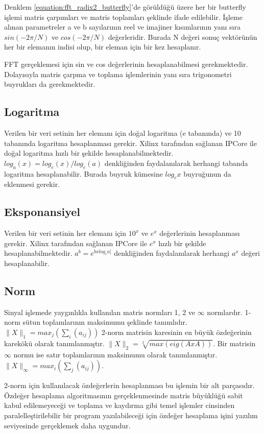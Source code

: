 Denklem \ref{equation:fft_radix2_butterfly}'de görüldüğü üzere her bir butterfly işlemi matris çarpımları ve matris toplamları şeklinde ifade edilebilir. İşleme alınan parametreler a ve b sayılarının reel ve imajiner kısımlarının yanı sıra $sin(-2\pi/N)$ ve $cos(-2\pi/N)$ değerleridir. Burada N değeri sonuç vektörünün her bir elemanın indisi olup, bir eleman için bir kez hesaplanır. \par
FFT gerçeklemesi için sin ve cos değerlerinin hesaplanabilmesi gerekmektedir. Dolayısıyla matris çarpma ve toplama işlemlerinin yanı sıra trigonometri buyrukları da gerekmektedir.

\subsection{Logaritma}
Verilen bir veri setinin her elemanı için doğal logaritma (e tabanında) ve 10 tabanında logaritma hesaplanması gerekir. Xilinx tarafından sağlanan IPCore ile doğal logaritma hızlı bir şekilde hesaplanabilmektedir. 
$log_{a}(x) = log_{e}(x) / log_{e}(a)$ 
denkliğinden faydalanılarak herhangi tabanda logaritma hesaplanabilir. Burada buyruk kümesine $log_{e}x$ buyruğunun da eklenmesi gerekir.

\subsection{Eksponansiyel}
Verilen bir veri setinin her elemanı için $10^{x}$ ve $e^{x}$ değerlerinin hesaplanması gerekir. Xilinx tarafından sağlanan IPCore ile $e^{x}$ hızlı bir şekilde hesaplanabilmektedir. $a^{b} = e^{b x log_{e}{a]}}$ denkliğinden faydalanılarak herhangi $a^{x}$ değeri hesaplanabilir.

\subsection{Norm}
Sinyal işlemede yaygınlıkla kullanılan matris normları 1, 2 ve $\infty$ normlardır. 1-norm sütun toplamlarının maksimumu şeklinde tanımlıdır. 
$\|X\|_{1} = max_{j}(\sum_{i}(a_{ij}))$ 2-norm matrisin karesinin en büyük özdeğerinin karekökü olarak tanımlanmıştır. $\|X\|_{2} = \sqrt[2]{max(eig(AxA))}$. Bir matrisin $\infty$ normu ise satır toplamlarının maksimumu olarak tanımlanmıştır. $\|X\|_{\infty} = max_{i}(\sum_{j}(a_{ij}))$.\cite{smith1997matlab}\par
2-norm için kullanılacak özdeğerlerin hesaplanması bu işlemin bir alt parçasıdır. Özdeğer hesaplama algoritmasının gerçeklenmesinde matris büyüklüğü sabit kabul edilemeyeceği ve toplama ve kaydırma gibi temel işlemler cinsinden paralelleştirilebilir bir program yazılabileceği için özdeğer hesaplama işini yazılım seviyesinde gerçeklemek daha uygundur.\cite{eigenvalueComputation} \par

